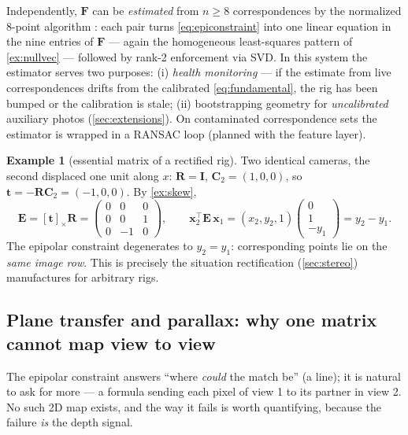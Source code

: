 \documentclass[11pt]{article}
\theoremstyle{definition}
\newtheorem{example}{Example}
\newcommand{\mat}[1]{\mathbf{#1}}
\newcommand{\vect}[1]{\mathbf{#1}}
\newcommand{\R}{\mat{R}}
\newcommand{\F}{\mat{F}}
\newcommand{\E}{\mat{E}}
\newcommand{\x}{\vect{x}}
\newcommand{\tv}{\vect{t}}
\newcommand{\Cv}{\vect{C}}
\begin{document}
Independently, $\F$ can be \emph{estimated} from $n\ge 8$ correspondences by
the normalized 8-point algorithm \cite{Hartley1997}: each pair turns
\eqref{eq:epiconstraint} into one linear equation in the nine entries of
$\F$ --- again the homogeneous least-squares pattern of
\autoref{ex:nullvec} --- followed by rank-2 enforcement via SVD. In this
system the estimator serves two purposes: (i) \emph{health monitoring} ---
if the estimate from live correspondences drifts from the calibrated
\eqref{eq:fundamental}, the rig has been bumped or the calibration is stale;
(ii) bootstrapping geometry for \emph{uncalibrated} auxiliary photos
(\autoref{sec:extensions}). On contaminated correspondence sets the
estimator is wrapped in a RANSAC loop \cite{FischlerBolles1981} (planned
with the feature layer).

\begin{example}[essential matrix of a rectified rig]
\label{ex:essential}
Two identical cameras, the second displaced one unit along $x$:
$\R=\mat I$, $\Cv_2=(1,0,0)$, so $\tv=-\R\Cv_2=(-1,0,0)$. By
\autoref{ex:skew},
\[
\E=[\tv]_\times\R=
\begin{pmatrix}0&0&0\\0&0&1\\0&-1&0\end{pmatrix},
\qquad
\x_2^{\!\top}\E\,\x_1
=(x_2,y_2,1)\begin{pmatrix}0\\1\\-y_1\end{pmatrix}
=y_2-y_1 .
\]
The epipolar constraint degenerates to $y_2=y_1$: corresponding points lie
on the \emph{same image row}. This is precisely the situation rectification
(\autoref{sec:stereo}) manufactures for arbitrary rigs.
\end{example}

\subsection{Plane transfer and parallax: why one matrix cannot map view
to view}
\label{sec:parallax}

The epipolar constraint answers ``where \emph{could} the match be'' (a
line); it is natural to ask for more --- a formula sending each pixel of
view 1 to its partner in view 2. No such 2D map exists, and the way it
fails is worth quantifying, because the failure \emph{is} the depth
signal.
\end{document}
